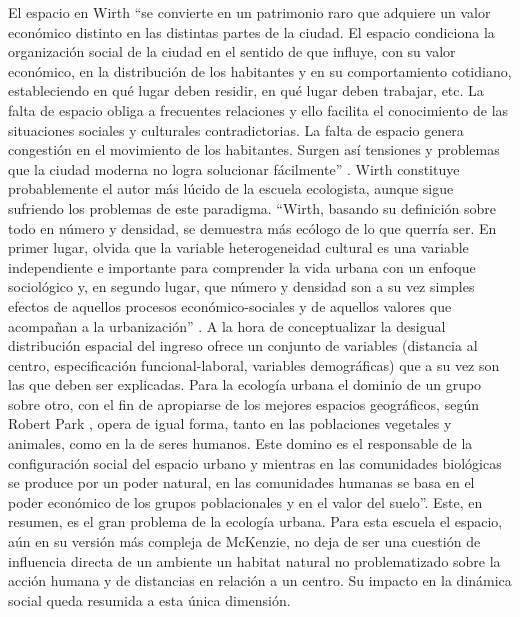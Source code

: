 El espacio en Wirth “se convierte en un patrimonio raro que adquiere un valor económico distinto en las distintas partes de la ciudad. El espacio condiciona la organización social de la ciudad en el sentido de que influye, con su valor económico, en la distribución de los habitantes y en su comportamiento cotidiano, estableciendo en qué lugar deben residir, en qué lugar deben trabajar, etc. La falta de espacio obliga a frecuentes relaciones y ello facilita el conocimiento de las situaciones sociales y culturales contradictorias. La falta de espacio genera congestión en el movimiento de los habitantes. Surgen así tensiones y problemas que la ciudad moderna no logra solucionar fácilmente” \cite[p.~106]{betin}. Wirth constituye probablemente el autor más lúcido de la escuela ecologista, aunque sigue sufriendo los problemas de este paradigma. “Wirth, basando su definición sobre todo en número y densidad, se demuestra más ecólogo de lo que querría ser. En primer lugar, olvida que la variable heterogeneidad cultural es una variable independiente e importante para comprender la vida urbana con un enfoque sociológico y, en segundo lugar, que número y densidad son a su vez simples efectos de aquellos procesos económico-sociales y de aquellos valores que acompañan a la urbanización” \cite[p.~106]{betin}. A la hora de conceptualizar la desigual distribución espacial del ingreso ofrece un conjunto de variables (distancia al centro, especificación funcional-laboral, variables demográficas) que a su vez son las que deben ser explicadas. Para la ecología urbana el dominio de un grupo sobre otro, con el fin de apropiarse de los mejores espacios geográficos, según Robert Park \citeyear{park}, opera de igual forma, tanto en las poblaciones vegetales y animales, como en la de seres humanos. Este domino es el responsable de la configuración social del espacio urbano y mientras en las comunidades biológicas se produce por un poder natural, en las comunidades humanas se basa en el poder económico de los grupos poblacionales y en el valor del suelo”. Este, en resumen, es el gran problema de la ecología urbana. Para esta escuela el espacio, aún en su versión más compleja de McKenzie, no deja de ser una cuestión de influencia directa de un ambiente un habitat natural no problematizado sobre la acción humana y de distancias en relación a un centro. Su impacto en la dinámica social queda resumida a esta única dimensión. 

